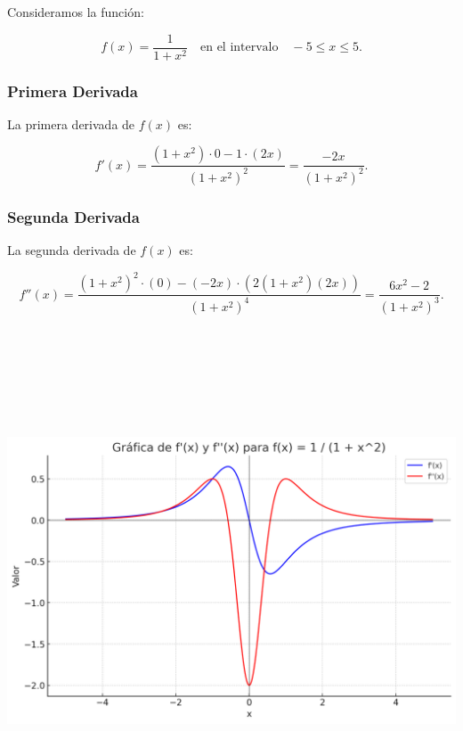 \documentclass[11pt,letterpaper]{article}
\begin{document}
Consideramos la función:

\[
f(x) = \frac{1}{1+x^2} \quad \text{en el intervalo} \quad -5 \leq x \leq 5.
\]

\subsubsection*{Primera Derivada}

La primera derivada de \( f(x) \) es:

\[
f'(x) = \frac{(1+x^2) \cdot 0 - 1 \cdot (2x)}{(1+x^2)^2} = \frac{-2x}{(1+x^2)^2}.
\]

\subsubsection*{Segunda Derivada}

La segunda derivada de \( f(x) \) es:

\[
f''(x) = \frac{(1+x^2)^2 \cdot (0) - (-2x) \cdot (2(1+x^2)(2x))}{(1+x^2)^4} = \frac{6x^2 - 2}{(1+x^2)^3}.
\]

\begin{center}
    \includegraphics[height=15.0cm]{./imagenes/grafica1.png}
\end{center}
\end{document}
